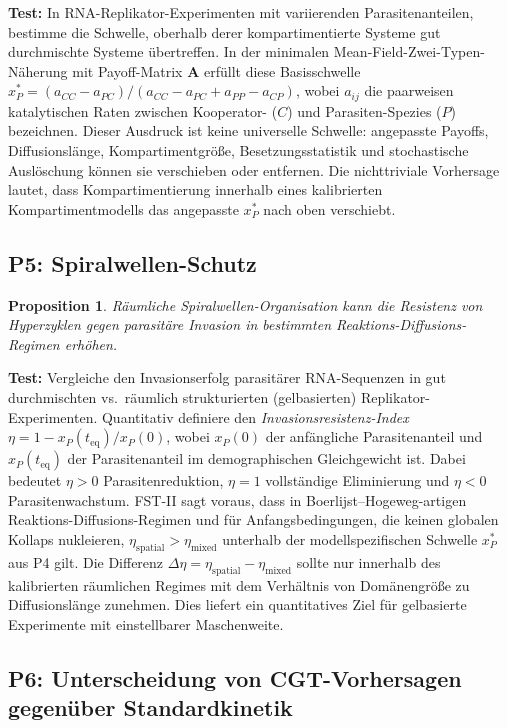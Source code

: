 \documentclass[12pt,a4paper]{article}
\newtheorem{proposition}{Proposition}
\theoremstyle{remark}
\begin{document}
\textbf{Test:} In RNA-Replikator-Experimenten mit variierenden Parasitenanteilen, bestimme die Schwelle, oberhalb derer kompartimentierte Systeme gut durchmischte Systeme übertreffen. In der minimalen Mean-Field-Zwei-Typen-Näherung mit Payoff-Matrix $\mathbf{A}$ erfüllt diese Basisschwelle $x_P^* = (a_{CC} - a_{PC})/(a_{CC} - a_{PC} + a_{PP} - a_{CP})$, wobei $a_{ij}$ die paarweisen katalytischen Raten zwischen Kooperator- ($C$) und Parasiten-Spezies ($P$) bezeichnen. Dieser Ausdruck ist keine universelle Schwelle: angepasste Payoffs, Diffusionslänge, Kompartimentgröße, Besetzungsstatistik und stochastische Auslöschung können sie verschieben oder entfernen. Die nichttriviale Vorhersage lautet, dass Kompartimentierung innerhalb eines kalibrierten Kompartimentmodells das angepasste $x_P^*$ nach oben verschiebt.

\subsection{P5: Spiralwellen-Schutz}

\begin{proposition}
Räumliche Spiralwellen-Organisation kann die Resistenz von Hyperzyklen gegen parasitäre Invasion in bestimmten Reaktions-Diffusions-Regimen erhöhen.
\end{proposition}

\textbf{Test:} Vergleiche den Invasionserfolg parasitärer RNA-Sequenzen in gut durchmischten vs.\ räumlich strukturierten (gelbasierten) Replikator-Experimenten. Quantitativ definiere den \emph{Invasionsresistenz-Index} $\eta = 1 - x_P(t_{\mathrm{eq}})/x_P(0)$, wobei $x_P(0)$ der anfängliche Parasitenanteil und $x_P(t_{\mathrm{eq}})$ der Parasitenanteil im demographischen Gleichgewicht ist. Dabei bedeutet $\eta > 0$ Parasitenreduktion, $\eta = 1$ vollständige Eliminierung und $\eta < 0$ Parasitenwachstum. FST-II sagt voraus, dass in Boerlijst--Hogeweg-artigen Reaktions-Diffusions-Regimen und für Anfangsbedingungen, die keinen globalen Kollaps nukleieren, $\eta_{\mathrm{spatial}} > \eta_{\mathrm{mixed}}$ unterhalb der modellspezifischen Schwelle $x_P^*$ aus P4 gilt. Die Differenz $\Delta\eta = \eta_{\mathrm{spatial}} - \eta_{\mathrm{mixed}}$ sollte nur innerhalb des kalibrierten räumlichen Regimes mit dem Verhältnis von Domänengröße zu Diffusionslänge zunehmen. Dies liefert ein quantitatives Ziel für gelbasierte Experimente mit einstellbarer Maschenweite.

\subsection{P6: Unterscheidung von CGT-Vorhersagen gegenüber Standardkinetik}
\end{document}
